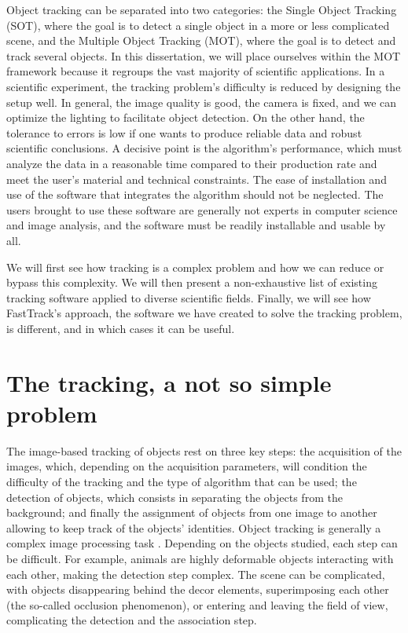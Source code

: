     Object tracking can be separated into two categories: the Single Object Tracking (SOT), where the goal is to detect a single object in a more or less complicated scene, and the Multiple Object Tracking (MOT), where the goal is to detect and track several objects. In this dissertation, we will place ourselves within the MOT framework because it regroups the vast majority of scientific applications. In a scientific experiment, the tracking problem's difficulty is reduced by designing the setup well. In general, the image quality is good, the camera is fixed, and we can optimize the lighting to facilitate object detection. On the other hand, the tolerance to errors is low if one wants to produce reliable data and robust scientific conclusions. A decisive point is the algorithm's performance, which must analyze the data in a reasonable time compared to their production rate and meet the user's material and technical constraints. The ease of installation and use of the software that integrates the algorithm should not be neglected. The users brought to use these software are generally not experts in computer science and image analysis, and the software must be readily installable and usable by all.

    We will first see how tracking is a complex problem and how we can reduce or bypass this complexity. We will then present a non-exhaustive list of existing tracking software applied to diverse scientific fields. Finally, we will see how FastTrack's approach, the software we have created to solve the tracking problem, is different, and in which cases it can be useful.

	\section{The tracking, a not so simple problem}
    The image-based tracking of objects rest on three key steps: the acquisition of the images, which, depending on the acquisition parameters, will condition the difficulty of the tracking and the type of algorithm that can be used; the detection of objects, which consists in separating the objects from the background; and finally the assignment of objects from one image to another allowing to keep track of the objects' identities. Object tracking is generally a complex image processing task \cite{dell2014automated}. Depending on the objects studied, each step can be difficult. For example, animals are highly deformable objects interacting with each other, making the detection step complex. The scene can be complicated, with objects disappearing behind the decor elements, superimposing each other (the so-called occlusion phenomenon), or entering and leaving the field of view, complicating the detection and the association step.

